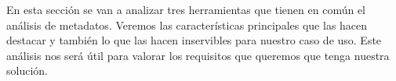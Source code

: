 En esta sección se van a analizar tres herramientas que tienen en común el análisis de metadatos. Veremos las características principales que las hacen destacar y también lo que las hacen inservibles para nuestro caso de uso. Este análisis nos será útil para valorar los requisitos que queremos que tenga nuestra solución.
